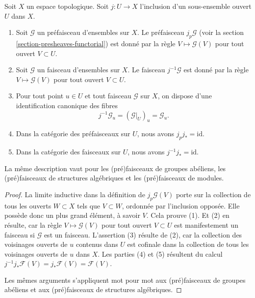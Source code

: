 \begin{lemma}
\label{lemma-j-pullback}
Soit $X$ un espace topologique.
Soit $j : U \to X$ l'inclusion d'un sous-ensemble ouvert $U$ dans $X$.
\begin{enumerate}
\item Soit $\mathcal{G}$ un préfaisceau d'ensembles sur $X$.
Le préfaisceau $j_p\mathcal{G}$
(voir la section \ref{section-presheaves-functorial}) est donné par la règle
$V \mapsto \mathcal{G}(V)$ pour tout ouvert $V \subset U$.
\item Soit $\mathcal{G}$ un faisceau d'ensembles sur $X$.
Le faisceau $j^{-1}\mathcal{G}$ est donné par la règle
$V \mapsto \mathcal{G}(V)$ pour tout ouvert $V \subset U$.
\item Pour tout point $u \in U$ et tout faisceau $\mathcal{G}$ sur $X$,
on dispose d'une identification canonique des fibres
$$
j^{-1}\mathcal{G}_u = (\mathcal{G}|_U)_u = \mathcal{G}_u.
$$
\item Dans la catégorie des préfaisceaux sur $U$, nous avons $j_pj_* = \text{id}$.
\item Dans la catégorie des faisceaux sur $U$, nous avons $j^{-1}j_* = \text{id}$.
\end{enumerate}
La même description vaut pour les (pré)faisceaux de groupes abéliens,
les (pré)faisceaux de structures algébriques et les (pré)faisceaux de modules.
\end{lemma}

\begin{proof}
La limite inductive dans la définition de $j_p\mathcal{G}(V)$
porte sur la collection de tous les ouverts $W \subset X$ tels que $V \subset W$,
ordonnée par l'inclusion opposée.
Elle possède donc un plus grand élément, à savoir $V$. Cela prouve (1).
Et (2) en résulte, car la règle $V \mapsto \mathcal{G}(V)$
pour tout ouvert $V \subset U$ est manifestement un faisceau si $\mathcal{G}$ est un
faisceau. L'assertion (3) résulte de (2), car la collection
des voisinages ouverts de $u$ contenus dans $U$ est cofinale
dans la collection de tous les voisinages ouverts de $u$ dans $X$.
Les parties (4) et (5) résultent du calcul
$j^{-1}j_*\mathcal{F}(V) = j_*\mathcal{F}(V) = \mathcal{F}(V)$.

\medskip\noindent
Les mêmes arguments s'appliquent mot pour mot aux (pré)faisceaux de groupes abéliens
et aux (pré)faisceaux de structures algébriques.
\end{proof}

